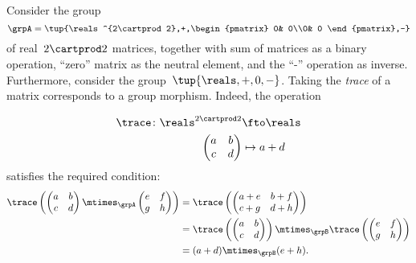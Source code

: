 \begin{example}
    Consider the group
    \begin{equation}
        \grpA=\tup{\reals^{2\cartprod 2},+,\begin{pmatrix}
                                               0& 0\\0& 0
        \end{pmatrix},-}
    \end{equation} of real~$2\cartprod 2$ matrices, together with sum of matrices as a binary operation, ``zero'' matrix as the neutral element, and the ``-'' operation as inverse.
    Furthermore, consider the group~$\tup{\reals,+,0,-}$. Taking the \emph{trace} of a matrix corresponds to a group morphism. Indeed, the operation
    
    \begin{equation*}
        \begin{aligned}
            \trace\colon \reals^{2\cartprod 2}&\fto \reals\\
            \begin{pmatrix}
                a & b \\
                c & d
            \end{pmatrix}&\mapsto a+d
        \end{aligned}
    \end{equation*}
    satisfies the required condition:
    \begin{equation*}
        \begin{aligned}
            \trace \left(\begin{pmatrix}
                             a & b \\
                             c & d
            \end{pmatrix} \mtimes_\grpA \begin{pmatrix}
                                            e & f \\
                                            g & h
            \end{pmatrix} \right)&=\trace \left( \begin{pmatrix}
                                                     a+e & b+f \\
                                                     c+g & d+h
            \end{pmatrix}\right)\\
            &=\trace \left( \begin{pmatrix}
                                a & b \\
                                c & d
            \end{pmatrix}\right)\mtimes_\grpB \trace \left( \begin{pmatrix}
                                                                e & f \\
                                                                g & h
            \end{pmatrix}\right)\\
            &=(a+d)\mtimes_\grpB (e+h).
        \end{aligned}
    \end{equation*}
\end{example}
